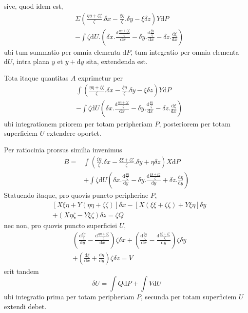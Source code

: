 sive, quod idem est,
\[
\begin{aligned}
&\Sigma(\frac{\eta\eta+\zeta\zeta}{\zeta}.\delta x-\frac{\xi\eta}{\zeta}.\delta y-\xi\delta z)Y\mathrm{d}P\\
&-\int\zeta\mathrm{d}U.(\delta x.\frac{\mathrm{d}\frac{\eta\eta+\zeta\zeta}{\zeta}}{\mathrm{d}x}-\delta y.\frac{\mathrm{d}\frac{\xi\eta}{\zeta}}{\mathrm{d}x}-\delta z.\frac{\mathrm{d}\xi}{\mathrm{d}x})
\end{aligned}
\]
ubi tum summatio per omnia elementa $\mathrm{d}P$, tum integratio per omnia elementa $\mathrm{d}U$, intra plana $y$ et $y+\mathrm{d}y$ sita, extendenda est.

Tota itaque quantitas $A$ exprimetur per
\[
\begin{aligned}
&\int(\frac{\eta\eta+\zeta\zeta}{\zeta}.\delta x-\frac{\xi\eta}{\zeta}.\delta y-\xi\delta z)Y\mathrm{d}P\\
&-\int\zeta\mathrm{d}U(\delta x.\frac{\mathrm{d}\frac{\eta\eta+\zeta\zeta}{\zeta}}{\mathrm{d}x}-\delta y.\frac{\mathrm{d}\frac{\xi\eta}{\zeta}}{\mathrm{d}x}-\delta z.\frac{\mathrm{d}\xi}{\mathrm{d}x})
\end{aligned}
\]
ubi integrationem priorem per totam peripheriam $P$, posteriorem per totam superficiem $U$ extendere oportet.

Per ratiocinia prorsus similia invenimus
\[
\begin{aligned}
B={}&\int(\frac{\xi\eta}{\zeta}.\delta x-\frac{\xi\xi+\zeta\zeta}{\zeta}.\delta y+\eta\delta z)X\mathrm{d}P\\
&+\int\zeta\mathrm{d}U(\delta x.\frac{\mathrm{d}\frac{\xi\eta}{\zeta}}{\mathrm{d}y}-\delta y.\frac{\mathrm{d}\frac{\xi\xi+\zeta\zeta}{\zeta}}{\mathrm{d}y}+\delta z.\frac{\mathrm{d}\eta}{\mathrm{d}y})
\end{aligned}
\]
Statuendo itaque, pro quovis puncto peripheriae $P$,
\[
\begin{aligned}
&[X\xi\eta+Y(\eta\eta+\zeta\zeta)]\delta x-[X(\xi\xi+\zeta\zeta)+Y\xi\eta]\delta y\\
&+(X\eta\zeta-Y\xi\zeta)\delta z=\zeta Q
\end{aligned}
\]
nec non, pro quovis puncto superficiei $U$,
\[
\begin{aligned}
&(\frac{\mathrm{d}\frac{\xi\eta}{\zeta}}{\mathrm{d}y}-\frac{\mathrm{d}\frac{\eta\eta+\zeta\zeta}{\zeta}}{\mathrm{d}x})\zeta\delta x+(\frac{\mathrm{d}\frac{\xi\eta}{\zeta}}{\mathrm{d}x}-\frac{\mathrm{d}\frac{\xi\xi+\zeta\zeta}{\zeta}}{\mathrm{d}y})\zeta\delta y\\
&+(\frac{\mathrm{d}\xi}{\mathrm{d}x}+\frac{\mathrm{d}\eta}{\mathrm{d}y})\zeta\delta z=V
\end{aligned}
\]
erit tandem
\[
\delta U=\int Q\mathrm{d}P+\int V\mathrm{d}U
\]
ubi integratio prima per totam peripheriam $P$, secunda per totam superficiem $U$ extendi debet.

